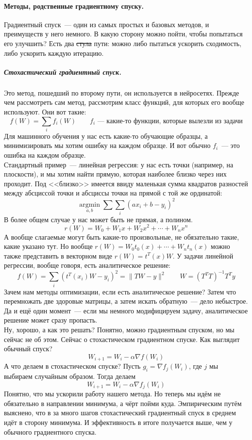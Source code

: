 \documentclass{article}
\begin{document}
    \paragraph{Методы, родственные градиентному спуску.}
    Градиентный спуск~--- один из самых простых и базовых методов, и преимуществ у него немного. В какую сторону можно пойти, чтобы попытаться его улучшить? Есть два \sout{стула} пути: можно либо пытаться ускорить сходимость, либо ускорить каждую итерацию.
    \subparagraph{Стохастический градиентный спуск.}
    Это метод, пошедший по второму пути, он используется в нейросетях. Прежде чем рассмотреть сам метод, рассмотрим класс функций, для которых его вообще используют. Они вот такие:
    $$
    f(W)=\sum\limits_i f_i(W)\qquad f_i\text{~--- какие-то функции, которые вылезли из задачи}
    $$
    Для машинного обучения у нас есть какие-то обучающие образцы, а минимизировать мы хотим ошибку на каждом образце. И вот обычно $f_i$~--- это ошибка на каждом образце.\\
    Стандартный пример~--- линейная регрессия: у нас есть точки (например, на плоскости), и мы хотим найти прямую, которая наиболее близко через них проходит. Под <<близко>> имеется ввиду маленькая сумма квадратов разностей между абсциссой точки и абсциссы точки на прямой с той же ординатой:
    $$
    \operatorname*{argmin}_{a,b}\sum\limits\sum\limits_i(ax_i+b-y_i)^2
    $$
    В более общем случае у нас может быть не прямая, а полином.
    $$
    r(W)=W_0+W_1x+W_2x^2+\cdots+W_nx^n
    $$
    А вообще слагаемые могут быть какие-то произвольные, не обязательно такие, какие указано тут. Но вообще $r(W)=W_0t_0(x)+\cdots+W_nt_n(x)$ можно также представить в векторном виде $r(W)=t^T(x)W$.
    У задачи линейной регрессии, вообще говоря, есть аналитическое решение:
    $$
    f(W)=\sum\limits_i(t^T(x_i)W-y_i)^2=\|TW-y\|^2\qquad W=(T^TT)^{-1}T^Ty
    $$
    Зачем нам методы оптимизации, если есть аналитическое решение? Затем что перемножать две здоровые матрицы, а затем искать обратную~--- дело небыстрое. Да и ещё один момент~--- если мы немного модифицируем задачу, аналитическое решение может сразу пропасть.\\
    Ну, хорошо, а как это решать? Понятно, можно градиентным спуском, но мы сейчас не об этом. Сейчас о стохастическом градиентном спуске. Как выглядит обычный спуск?
    $$
    W_{i+1}=W_i-\alpha\nabla f(W_i)
    $$
    А что делаем в стохастическом спуске? Пусть $g_i=\nabla f_j(W_i)$, где $j$ мы выбираем случайным образом. Тогда делаем
    $$
    W_{i+1}=W_i-\alpha\nabla f_j(W_i)
    $$
    Понятно, что мы ускорили работу нашего метода. Но теперь мы идём не обязательно в направлении минимума, а чёрт пойми куда. Эмпирическим путём выяснено, что в за много шагов стохастический градиентный спуск в среднем идёт в сторону минимума. И эффективность в итоге получается выше, чем у обычного градиентного спуска.\\
\end{document}
